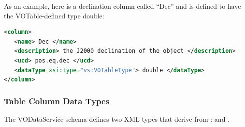 \documentclass[11pt,a4paper]{ivoa}
\begin{document}
As an example, here is a declination column called ``Dec'' and is
defined to have the VOTable-defined type double:

\begin{lstlisting}[language=XML]
<column>
   <name> Dec </name>
   <description> the J2000 declination of the object </description>
   <ucd> pos.eq.dec </ucd>
   <dataType xsi:type="vs:VOTableType"> double </dataType>
</column>
\end{lstlisting}


\subsubsection{Table Column Data Types}
\label{tbldatatypes}


The VODataService schema defines two XML types that derive from
:   and
.  
\end{document}
